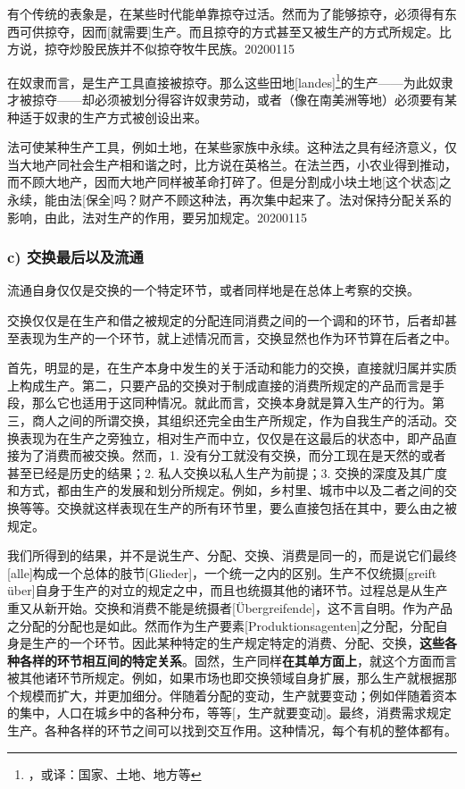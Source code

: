 \documentclass[a5paper,twoside,10.5pt]{ctexart}
\begin{document}
有个传统的表象是，在某些时代能单靠掠夺过活。然而为了能够掠夺，必须得有东西可供掠夺，因而[就需要]生产。而且掠夺的方式甚至又被生产的方式所规定。比方说，掠夺炒股民族并不似掠夺牧牛民族。20200115

在奴隶而言，是生产工具直接被掠夺。那么这些田地[landes]\footnote{，或译：国家、土地、地方等}的生产——为此奴隶才被掠夺——却必须被划分得容许奴隶劳动，或者（像在南美洲等地）必须要有某种适于奴隶的生产方式被创设出来。

法可使某种生产工具，例如土地，在某些家族中永续。这种法之具有经济意义，仅当大地产同社会生产相和谐之时，比方说在英格兰。在法兰西，小农业得到推动，而不顾大地产，因而大地产同样被革命打碎了。但是分割成小块土地[这个状态]之永续，能由法[保全]吗？财产不顾这种法，再次集中起来了。法对保持分配关系的影响，由此，法对生产的作用，要另加规定。20200115

\subsubsection{c) 交换最后以及流通}

流通自身仅仅是交换的一个特定环节，或者同样地是在总体上考察的交换。

交换仅仅是在生产和借之被规定的分配连同消费之间的一个调和的环节，后者却甚至表现为生产的一个环节，就上述情况而言，交换显然也作为环节算在后者之中。 

首先，明显的是，在生产本身中发生的关于活动和能力的交换，直接就归属并实质上构成生产。第二，只要产品的交换对于制成直接的消费所规定的产品而言是手段，那么它也适用于这同种情况。就此而言，交换本身就是算入生产的行为。第三，商人之间的所谓交换，其组织还完全由生产所规定，作为自我生产的活动。交换表现为在生产之旁独立，相对生产而中立，仅仅是在这最后的状态中，即产品直接为了消费而被交换。然而，1. 没有分工就没有交换，而分工现在是天然的或者甚至已经是历史的结果；2. 私人交换以私人生产为前提；3. 交换的深度及其广度和方式，都由生产的发展和划分所规定。例如，乡村里、城市中以及二者之间的交换等等。交换就这样表现在生产的所有环节里，要么直接包括在其中，要么由之被规定。

我们所得到的结果，并不是说生产、分配、交换、消费是同一的，而是说它们最终[alle]构成一个总体的肢节[Glieder]，一个统一之内的区别。生产不仅统摄[greift über]自身于生产的对立的规定之中，而且也统摄其他的诸环节。过程总是从生产重又从新开始。交换和消费不能是统摄者[Übergreifende]，这不言自明。作为产品之分配的分配也是如此。然而作为生产要素[Produktionsagenten]之分配，分配自身是生产的一个环节。因此某种特定的生产规定特定的消费、分配、交换，\textbf{这些各种各样的环节相互间的特定关系}。固然，生产同样\textbf{在其单方面上}，就这个方面而言被其他诸环节所规定。例如，如果市场也即交换领域自身扩展，那么生产就根据那个规模而扩大，并更加细分。伴随着分配的变动，生产就要变动；例如伴随着资本的集中，人口在城乡中的各种分布，等等[，生产就要变动]。最终，消费需求规定生产。各种各样的环节之间可以找到交互作用。这种情况，每个有机的整体都有。
\end{document}
